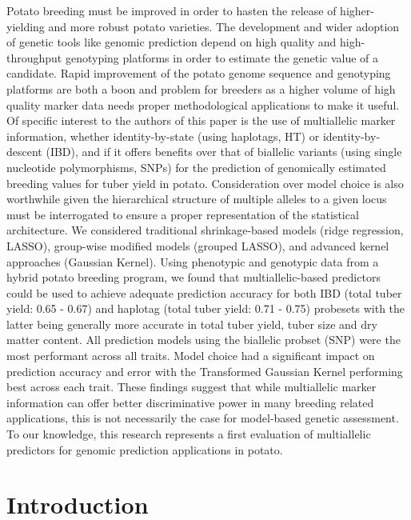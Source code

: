Potato breeding must be improved in order to hasten the release of
higher-yielding and more robust potato varieties. The
development and wider adoption of genetic tools like genomic prediction
depend on high quality and high-throughput genotyping platforms in order
to estimate the genetic value of a candidate. Rapid improvement of the
potato genome sequence and genotyping platforms are both a boon and
problem for breeders as a higher volume of high quality marker data
needs proper methodological applications to make it useful. Of specific
interest to the authors of this paper is the use of multiallelic
marker information, whether identity-by-state (using haplotags, HT) or
identity-by-descent (IBD), and if it offers benefits over that of
biallelic variants (using single nucleotide polymorphisms, SNPs) for the
prediction of genomically estimated breeding values for tuber yield in
potato. Consideration over model choice is also worthwhile given the
hierarchical structure of multiple alleles to a given locus must be
interrogated to ensure a proper representation of the statistical
architecture. We considered traditional shrinkage-based models (ridge
regression, LASSO), group-wise modified models (grouped LASSO), and
advanced kernel approaches (Gaussian Kernel). Using phenotypic and
genotypic data from a hybrid potato breeding program, we found that
multiallelic-based predictors could be used to achieve adequate prediction
accuracy for both IBD (total tuber yield: 0.65 - 0.67) and haplotag
(total tuber yield: 0.71 - 0.75) probesets with the latter being
generally more accurate in total tuber yield, tuber size and dry matter
content. All prediction models using the biallelic probset (SNP) were
the most performant across all traits. Model choice had a
significant impact on prediction accuracy and error with the Transformed
Gaussian Kernel performing best across each trait. These findings
suggest that while multiallelic marker information can offer better
discriminative power in many breeding related applications, this is
not necessarily the case for model-based genetic assessment. To our knowledge, this research represents a first evaluation of multiallelic predictors for genomic prediction applications in
potato.

\hypertarget{introduction}{%
\section{Introduction}\label{introduction}}

